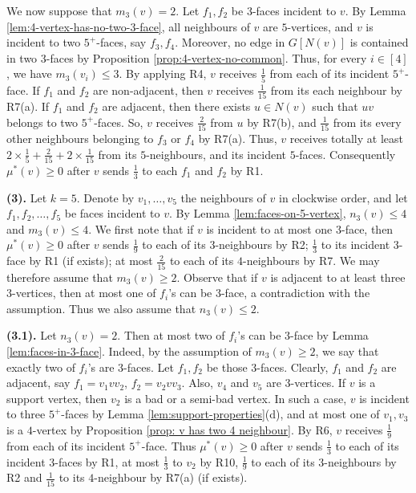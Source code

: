 \documentclass[12pt, reqno]{amsart}
\theoremstyle{plain}
\theoremstyle{definition}
\numberwithin{equation}{section}
\begin{document}
We now suppose that  $m_3(v)=2$. Let $f_1,f_2$ be $3$-faces incident to $v$. By Lemma \ref{lem:4-vertex-has-no-two-3-face}, all neighbours of $v$ are $5$-vertices, and $v$ is incident to two $5^+$-faces, say $f_3,f_4$. Moreover, no edge in  $G[N(v)]$ is contained in two $3$-faces by Proposition \ref{prop:4-vertex-no-common}. Thus, for every $i\in [4]$, we have $m_3(v_i)\leq 3$. By applying R4, $v$ receives $\frac{1}{5}$ from each of its incident $5^+$-face. If $f_1$ and $f_2$ are non-adjacent, then $v$ receives $\frac{1}{15}$ from its each neighbour by R7(a).  If $f_1$ and $f_2$ are adjacent, then there exists $u\in N(v)$ such that $uv$ belongs to two $5^+$-faces. So, $v$   receives $\frac{2}{15}$ from $u$ by R7(b), and $\frac{1}{15}$ from its every other neighbours belonging to $f_3$ or $f_4$ by R7(a). Thus, $v$ receives totally at least $2\times\frac{1}{5}+\frac{2}{15}+2\times\frac{1}{15}$ from its $5$-neighbours, and its incident $5$-faces. Consequently  $\mu^*(v)\geq 0$ after $v$ sends $\frac{1}{3}$ to each $f_1$ and $f_2$ by R1.  \medskip



\textbf{(3).} Let $k=5$. Denote by $v_1,\ldots, v_5$ the neighbours of $v$ in clockwise order, and let $f_1,f_2,\ldots, f_5$ be faces incident to $v$. By Lemma \ref{lem:faces-on-5-vertex}, $n_3(v)\leq 4$ and $m_3(v)\leq 4$. 
We first note that if $v$ is incident to at most one $3$-face, then  $\mu^*(v)\geq 0$ after $v$  sends $\frac{1}{9}$ to each of its $3$-neighbours by R2; $\frac{1}{3}$ to its incident $3$-face by R1 (if exists); at most $\frac{2}{15}$ to each of its $4$-neighbours by R7. We may therefore assume that $m_3(v)\geq 2$. 
Observe that if $v$ is adjacent to at least three $3$-vertices, then at most one of $f_i$'s can be $3$-face, a contradiction with the assumption. Thus we also assume that $n_3(v)\leq 2$. \medskip



\textbf{(3.1).} Let $n_3(v)=2$. Then at most two of $f_i$'s can be $3$-face by Lemma \ref{lem:faces-in-3-face}.  Indeed, by the assumption of $m_3(v)\geq 2$, we say that exactly two of $f_i$'s are $3$-faces. Let $f_1,f_2$ be those $3$-faces. Clearly, $f_1$ and $f_2$ are adjacent, say $f_1=v_1vv_2$, $f_2=v_2vv_3$. Also, $v_4$ and $v_5$ are $3$-vertices.
If $v$ is a support vertex, then $v_2$ is a bad or a semi-bad vertex. In such a case,  %
 $v$ is incident to three $5^+$-faces by Lemma \ref{lem:support-properties}(d), and at  most one of $v_1, v_3$ is a $4$-vertex by Proposition \ref{prop:  v has two 4 neighbour}.  By R6, $v$ receives $\frac{1}{9}$ from each of its incident $5^+$-face. Thus $\mu^*(v)\geq 0$ after $v$ sends $\frac{1}{3}$ to each of its incident $3$-faces by R1, at most $\frac{1}{3}$ to $v_2$ by R10, $\frac{1}{9}$ to each of its $3$-neighbours by R2 and $\frac{1}{15}$ to its $4$-neighbour by R7(a) (if exists).
  
\end{document}
